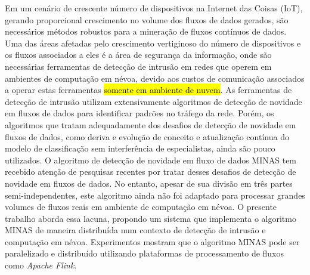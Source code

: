 \begin{resumo}

    Em um cenário de crescente número de dispositivos na Internet das Coisas
    (IoT), gerando proporcional crescimento no volume dos fluxos de dados
    gerados, são necessários métodos robustos para a mineração de fluxos
    contínuos de dados.
    Uma das áreas afetadas pelo crescimento vertiginoso do número de
    dispositivos e os fluxos associados a eles é a área de segurança da
    informação, onde são necessárias ferramentas de detecção de intrusão em
    redes que operem em ambientes de computação em névoa, devido aos custos de
    comunicação associados a operar estas ferramentas 
    \hl{somente em ambiente de nuvem}.
    As ferramentas de detecção de intrusão utilizam extensivamente algoritmos de
    detecção de novidade em fluxos de dados para identificar padrões no tráfego
    da rede.
    Porém, os algoritmos que tratam adequadamente dos desafios de detecção de
    novidade em fluxos de dados, como deriva e evolução de conceito e
    atualização contínua do modelo de classificação sem interferência de
    especialistas, ainda são pouco utilizados.
    O algoritmo de detecção de novidade em fluxo de dados MINAS tem recebido
    atenção de pesquisas recentes por tratar desses desafios de detecção de novidade
    em fluxos de dados.
    No entanto, apesar de sua divisão em três partes semi-independentes, este
    algoritmo ainda não foi adaptado para processar grandes volumes de fluxos
    reais em ambiente de computação em névoa.
    O presente trabalho aborda essa lacuna, propondo um sistema
    que implementa o algoritmo MINAS de maneira distribuída num contexto
    de detecção de intrusão e computação em névoa.
    Experimentos mostram que o algoritmo MINAS pode ser paralelizado e
    distribuído utilizando plataformas de processamento de fluxos como
    \emph{Apache Flink}.


\end{resumo}

